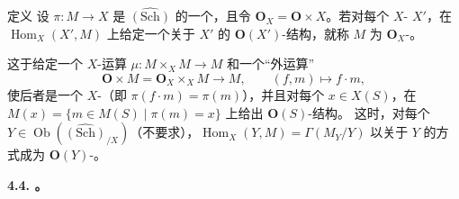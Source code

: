 \begin{SGAresult}{定义}{}
设 $\pi:M\to X$ 是 $\widehat{(\mathrm{Sch})}$ 的一个，且令 $\mathbf O_X=\mathbf O\times X$。若对每个 $X$- $X'$，在 $\operatorname{Hom}_X(X',M)$ 上给定一个关于 $X'$ 的 $\mathbf O(X')$-结构，就称 $M$ 为 $\mathbf O_X$-。
\end{SGAresult}
这于给定一个 $X$-运算 $\mu:M\times_X M\to M$ 和一个“外运算”
\[
\mathbf O\times M=\mathbf O_X\times_X M\longrightarrow M,\qquad(f,m)\longmapsto f\cdot m,
\]
使后者是一个 $X$-（即 $\pi(f\cdot m)=\pi(m)$），并且对每个 $x\in X(S)$，在 $M(x)=\{m\in M(S)\mid\pi(m)=x\}$ 上给出 $\mathbf O(S)$-结构。
这时，对每个 $Y\in\operatorname{Ob}(\widehat{(\mathrm{Sch})}_{/X})$（不要求），$\operatorname{Hom}_X(Y,M)=\Gamma(M_Y/Y)$ 以关于 $Y$ 的方式成为 $\mathbf O(Y)$-。

\textbf{4.4. 。}

